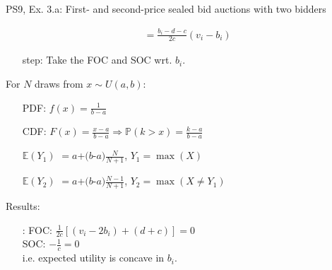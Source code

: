 \begin{frame}{PS9, Ex. 3.a: First- and second-price sealed bid auctions with two bidders}
\begin{multicols}{2}
\begin{align*}
                                &=\frac{b_i-d-c}{2c}(v_i-b_i)
      \end{align*}
      \vspace{-10pt}
      \begin{itemize}
        \item[\nth{2} step:] Take the FOC and SOC wrt. $b_i$.
      \end{itemize}
      \vfill\null\columnbreak
      For $N$ draws from $x\sim U(a, b):$
      \vspace{-6pt}
      \begin{enumerate}
        \item[PDF:] $f(x)=\frac{1}{b-a}$
        \item[CDF:] $F(x)=\frac{x-a}{b-a}\Rightarrow\mathbb{P}(k>x)=\frac{k-a}{b-a}$
        \item[$\mathbb{E}(Y_1)$] $=a$+$(b$-$a)\frac{N}{N+1}$, $Y_1=\max(X)$
        \item[$\mathbb{E}(Y_2)$] $=a$+$(b$-$a)\frac{N-1}{N+1}$, $Y_2=\max(X\neq Y_1)$
      \end{enumerate}
      \vspace{-6pt}
      Results:
      \vspace{-6pt}
      \begin{itemize}
        \item[\nth{2}:] FOC: $\frac{1}{2c}[(v_i-2b_i)+(d+c)]=0$\\
                        SOC: $-\frac{1}{c}=0$\\
                        i.e. expected utility is concave in $b_i$.
      \end{itemize}
      \vfill\null
    \end{multicols}
\end{frame}
